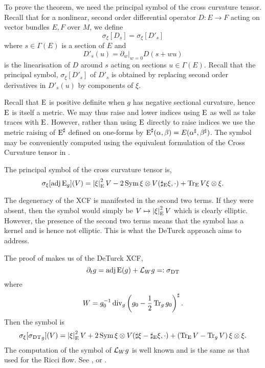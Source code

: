 \documentclass[a4paper,12pt]{amsart}
\begin{document}
To prove the theorem, we need the principal symbol of the cross curvature tensor. Recall that for a nonlinear, second order differential operator \(D : E \to F\) acting on vector bundles \(E, F\) over \(M\), we define
\begin{equation}
\label{eq:symbol}
\sigma_{\xi} [D_s] = \sigma_{\xi} [D'_s]
\end{equation}
where \(s \in \Gamma(E)\) is a section of \(E\) and
\[
D'_s (u) = \partial_w|_{w=0} D(s + w u)
\]
is the linearisation of \(D\) around \(s\) acting on sections \(u \in \Gamma(E)\). Recall that the principal symbol, \(\sigma_{\xi} [D'_s]\) of \(D'_s\) is obtained by replacing second order derivatives in \(D'_s (u)\) by components of \(\xi\).

Recall that \(\operatorname{E}\) is positive definite when \(g\) has negative sectional curvature, hence \(\operatorname{E}\) is itself a metric. We may thus raise and lower indices using \(\operatorname{E}\) as well as take traces with \(\operatorname{E}\). However, rather than using \(\operatorname{E}\) directly to raise indices we use the metric raising of \(\operatorname{E}^{\sharp}\) defined on one-forms by \(\operatorname{E}^{\sharp} (\alpha, \beta) = E(\alpha^{\sharp}, \beta^{\sharp})\). The symbol may be conveniently computed using the equivalent formulation of the Cross Curvature tensor in .

\begin{lemma}
\label{lem:xcf_symbol}
The principal symbol of the cross curvature tensor is,
\[
\sigma_{\xi} [\operatorname{adj}\operatorname{E}_g] (V) = \left\lvert{\xi}\right\rvert^2_{\operatorname{E}}V - 2 \operatorname{Sym} \xi \otimes V(\sharp_{\operatorname{E}}\xi, \cdot) + \operatorname{Tr}_{\operatorname{E}} V \xi \otimes \xi.
\]
\end{lemma}

The degeneracy of the XCF is manifested in the second two terms. If they were absent, then the symbol would simply be \(V \mapsto \left\lvert{\xi}\right\rvert^2_{\operatorname{E}} V\) which is clearly elliptic. However, the presence of the second two terms means that the symbol has a kernel and is hence not elliptic. This is what the DeTurck approach aims to address.

The proof of  makes us of the DeTurck XCF,
\begin{equation}
\label{eq:dtxcf}
\partial_t g = \operatorname{adj}\operatorname{E} (g) + \mathcal{L}_W g =: \operatorname{\operatorname{\sigma}_{\operatorname{DT}}}
\end{equation}
where
\[
W = g_0^{-1} \operatorname{div}_g \left(g_0 - \frac{1}{2}\operatorname{Tr}_g g_0\right)^{\sharp}.
\]
Then the symbol is
\begin{equation}
\label{eq:dtxcf_symbol}
\sigma_{\xi} [\operatorname{\operatorname{\sigma}_{\operatorname{DT}}}_g] (V) = \left\lvert{\xi}\right\rvert^2_{\operatorname{E}}V + 2 \operatorname{Sym} \xi \otimes V(\sharp \xi - \sharp_{\operatorname{E}}\xi, \cdot) + \left(\operatorname{Tr}_{\operatorname{E}} V - \operatorname{Tr}_g V\right) \xi \otimes \xi.
\end{equation}
The computation of the symbol of \(\mathcal{L}_W g\) is well known and is the same as that used for the Ricci flow. See \cite{MR2207496}, \cite[Sections 3.3, 3.4]{MR2061425} or \cite[Chapter 5]{MR2265040}.
\end{document}
